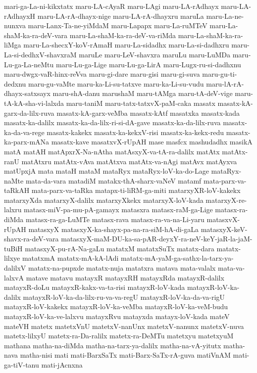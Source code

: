 {mari-ga-La-ni-kikxtatx
maru-LA-cAyaR
maru-LAgi
maru-LA-rAdhayx
maru-LA-rAdhayxH
maru-LA-rA-dhayx-nige
maru-LA-rA-dhayxru
maruLa
maru-La-ne-nunxva
maru-Lanx-Ta-ne-yiMdaM
maru-Lapapx
maru-La-ruMTeV
maru-La-shaM-ka-ra-deV-vara
maru-La-shaM-ka-ra-deV-va-riMda
maru-La-shaM-ka-ra-liMga
maru-La-shecxY-koV-rAmaH
maru-La-sidadhx
maru-La-si-dadhxru
maru-La-si-dedhxV-shavxraM
maruLe
maru-LeV-shavxra
maruLu
maru-LuMDa
maru-Lu-ga-La-neMtu
maru-Lu-ga-Lige
maru-Lu-ga-LirA
maru-Lugx-ru-si-dadhxnu
maru-dwgx-vaR-hinx-reVva
maru-gi-dare
maru-gisi
maru-gi-suva
maru-gu-ti-dedxnu
maru-gu-vaMte
maru-ka-Li-su-tatxve
maru-ka-Li-su-vudu
maru-lA-rA-dhayx-satxsayx
maru-shA-danu
marushaM
maru-tAMga
maru-tA-deV-vige
maru-tA-kA-sha-vi-lalxda
maru-taniM
maru-tatx-tatxvX-paM-caka
masatx
masatx-kA-garx-da-lilx-ruva
masatx-kA-garx-veMba
masatx-kAtf
masatxka
masatx-kada
masatx-ka-dalilx
masatx-ka-da-lilx-ri-si-dA-gave
masatx-ka-da-lilx-ruva
masatx-ka-da-va-rege
masatx-kakekx
masatx-ka-kekxV-risi
masatx-ka-kekx-redu
masatx-ka-parx-mANa
masatx-kave
masatxvX-rUpAH
mase
masfcx
mashudadhx
masikA
matA
matAH
matApxrX-Na-nAtha
matAsxyX-va-tA-ra-dalilx
matAtx
matAtx-ranU
matAtxru
matAtx-vAva
matAtxva
matAtx-va-nAgi
matAvx
matAyxva
matUpxjA
mata
mataH
mataM
mataRyx
mataRyx-loV-ka-do-Lage
mataRyx-naMte
mata-da-vara
matadiM
matakx-thA-sharx-vaNeV
matamf
mata-parx-va-taRkAH
mata-parx-va-taRka
matapx-ti-liRM-ga-miti
matarxyXR-loV-kakekx
matarxyXda
matarxyX-dalilx
matarxyXkekx
matarxyX-loV-kada
matarxyX-re-lalxru
matasx-miV-pa-mu-pA-gamayx
matasxra
matasx-raM-ga-Lige
matasx-ra-diMda
matasx-ra-ga-LuMTe
matasx-rava
matasx-ra-va-na-Li-yaru
matasxvX-rUpAH
matasxyX
matasxyX-ka-shayx-pa-na-ra-siM-hA-di-gaLa
matasxyX-keV-shavx-ra-deV-vara
matasxyX-maM-DU-ka-sa-pAR-deyxY-ra-neV-keY-jaR-la-jaM-tuBiH
matasxyX-pu-rA-Na-gaLu
matatxM
matatxSuTx
matatx-dara
matatx-lilxye
matatxmA
matatx-mA-kA-lAdi
matatx-mA-yaM-ga-sathx-la-tarx-ya-dalilxV
matatx-na-pupxde
matatx-nuja
matatxra
matava
mata-valalx
mata-va-lalxvA
matave
matavu
matayxR
matayxRH
matayxRda
matayxR-dalilx
matayxR-doLu
matayxR-kakx-va-ta-risi
matayxR-loV-kada
matayxR-loV-ka-dalilx
matayxR-loV-ka-da-lilx-ru-va-va-regU
matayxR-loV-ka-da-va-rigU
matayxR-loV-kakekx
matayxR-loV-ka-veMba
matayxR-loV-ka-veM-budu
matayxR-loV-ka-ve-lalxvu
matayxRvu
matayxda
matayx-loV-kada
mateV
mateVH
matetx
matetxVnU
matetxV-nanUnx
matetxV-nanunx
matetxV-nuva
matetx-lilxyU
matetx-ra-Da-ralilx
matetx-ra-DeMTu
matetxyu
matetxyuM
mathana
matha-na-diMda
matha-na-tarx-ya-dalilx
matha-na-vA-yitutx
matha-nava
matha-nisi
mati
mati-BarxSaTx
mati-Barx-SaTx-rA-guva
matiVnAM
mati-ga-tiV-tanu
mati-jAcnxna
}
